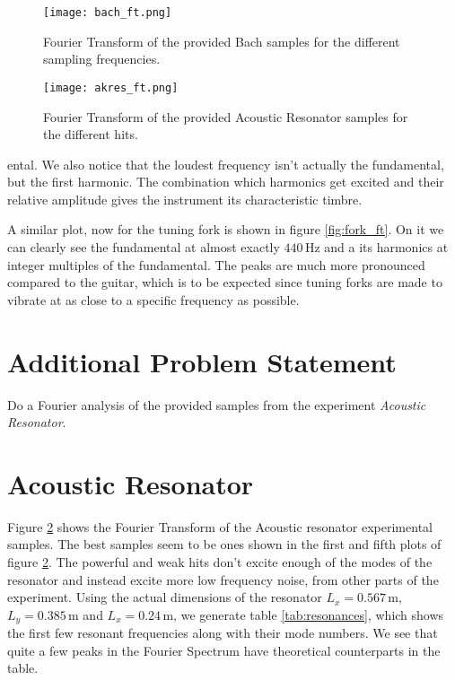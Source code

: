 \documentclass[10pt,a4paper,twocolumn]{article}
\begin{document}
\onecolumn

\begin{figure}
\centering
\captionsetup{justification=centering}
\texttt{[image: bach\_ft.png]}
\caption{Fourier Transform of the provided Bach samples for the different sampling frequencies.}
\label{fig:bach_ft}
\end{figure}

\begin{figure}
\centering
\captionsetup{justification=centering}
\texttt{[image: akres\_ft.png]}
\caption{Fourier Transform of the provided Acoustic Resonator samples for the different hits.}
\label{fig:akres_ft}
\end{figure}

\twocolumn

\noindent
ental. We also notice that the loudest frequency isn't actually the fundamental, but the first harmonic. The combination which harmonics get excited and their relative amplitude gives the instrument its characteristic timbre.

A similar plot, now for the tuning fork is shown in figure \ref{fig:fork_ft}. On it we can clearly see the fundamental at almost exactly $440 \,\mathrm{Hz}$ and a its harmonics at integer multiples of the fundamental. The peaks are much more pronounced compared to the guitar, which is to be expected since tuning forks are made to vibrate at as close to a specific frequency as possible.


\section{Additional Problem Statement}

Do a Fourier analysis of the provided samples from the experiment \emph{Acoustic Resonator}.


\section{Acoustic Resonator}

Figure \ref{fig:akres_ft} shows the Fourier Transform of the Acoustic resonator experimental samples. The best samples seem to be ones shown in the first and fifth plots of figure \ref{fig:akres_ft}. The powerful and weak hits don't excite enough of the modes of the resonator and instead excite more low frequency noise, from other parts of the experiment. Using the actual dimensions of the resonator $L_x = 0.567 \,\mathrm{m}$, $L_y = 0.385 \,\mathrm{m}$ and $L_x = 0.24 \,\mathrm{m}$, we generate table \ref{tab:resonances}, which shows the first few resonant frequencies along with their mode numbers. We see that quite a few peaks in the Fourier Spectrum have theoretical counterparts in the table.
\end{document}
